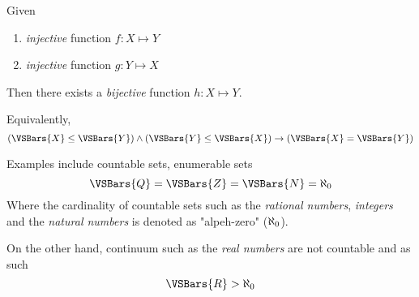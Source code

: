 \begin{theorem}
    Given
    \begin{enumerate}
        \item \textit{injective} function $f \colon X \mapsto Y$
        \item \textit{injective} function $g \colon Y \mapsto X$
    \end{enumerate}
    Then there exists a \textit{bijective} function $h \colon X \mapsto Y$.
    
    Equivalently,
    \begin{equation}
        (\VSBars{X} \le \VSBars{Y}) \land (\VSBars{Y} \le \VSBars{X}) \to (\VSBars{X} = \VSBars{Y})
    \end{equation}
\end{theorem}

\begin{remark}
    Examples include countable sets, enumerable sets
    \begin{equation}
        \VSBars{\Rational} = \VSBars{\Int} = \VSBars{\NatNum} = \AlephZero
    \end{equation}
    Where the cardinality of countable sets such as the \textit{rational numbers}, \textit{integers} and the \textit{natural numbers} is denoted as "alpeh-zero" ($\aleph_{0}$).
    
    On the other hand, continuum such as the \textit{real numbers} are not countable and as such
    \begin{equation}
        \VSBars{\Real} > \AlephZero
    \end{equation}
\end{remark}

